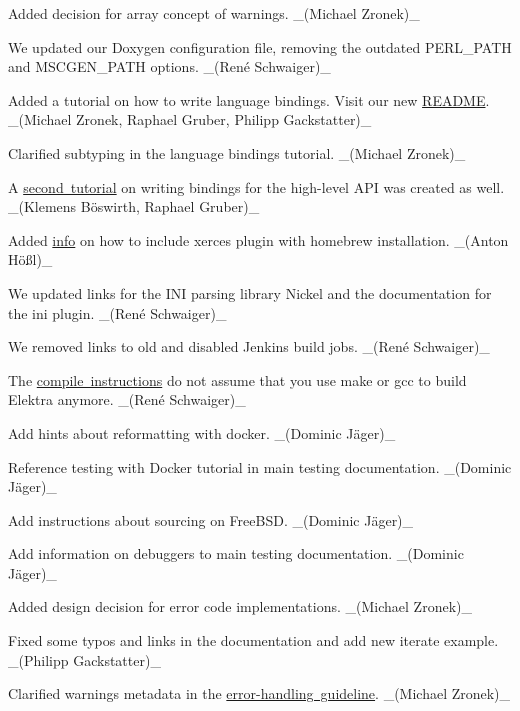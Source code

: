 \begin{DoxyItemize}
\item Added decision for array concept of warnings. \+\_\+(\+Michael Zronek)\+\_\+
\item We updated our Doxygen configuration file, removing the outdated {\ttfamily P\+E\+R\+L\+\_\+\+P\+A\+TH} and {\ttfamily M\+S\+C\+G\+E\+N\+\_\+\+P\+A\+TH} options. \+\_\+(René Schwaiger)\+\_\+
\item Added a tutorial on how to write language bindings. Visit our new \mbox{\hyperlink{doc_tutorials_language-bindings_md}{R\+E\+A\+D\+ME}}. \+\_\+(\+Michael Zronek, Raphael Gruber, Philipp Gackstatter)\+\_\+
\item Clarified subtyping in the language bindings tutorial. \+\_\+(\+Michael Zronek)\+\_\+
\item A \mbox{\hyperlink{doc_tutorials_highlevel-bindings_md}{second tutorial}} on writing bindings for the high-\/level A\+PI was created as well. \+\_\+(Klemens Böswirth, Raphael Gruber)\+\_\+
\item Added \mbox{\hyperlink{autotoc_md716_src_plugins_xerces_README_md}{info}} on how to include xerces plugin with homebrew installation. \+\_\+(Anton Hößl)\+\_\+
\item We updated links for the I\+NI parsing library Nickel and the documentation for the ini plugin. \+\_\+(René Schwaiger)\+\_\+
\item We removed links to old and disabled Jenkins build jobs. \+\_\+(René Schwaiger)\+\_\+
\item The \mbox{\hyperlink{doc_COMPILE_md}{compile instructions}} do not assume that you use {\ttfamily make} or {\ttfamily gcc} to build Elektra anymore. \+\_\+(René Schwaiger)\+\_\+
\item Add hints about reformatting with docker. \+\_\+(Dominic Jäger)\+\_\+
\item Reference testing with Docker tutorial in main testing documentation. \+\_\+(Dominic Jäger)\+\_\+
\item Add instructions about sourcing on Free\+B\+SD. \+\_\+(Dominic Jäger)\+\_\+
\item Add information on debuggers to main testing documentation. \+\_\+(Dominic Jäger)\+\_\+
\item Added design decision for error code implementations. \+\_\+(\+Michael Zronek)\+\_\+
\item Fixed some typos and links in the documentation and add new iterate example. \+\_\+(\+Philipp Gackstatter)\+\_\+
\item Clarified warnings metadata in the \mbox{\hyperlink{doc_dev_error-handling_md}{error-\/handling guideline}}. \+\_\+(\+Michael Zronek)\+\_\+

\end{DoxyItemize}
